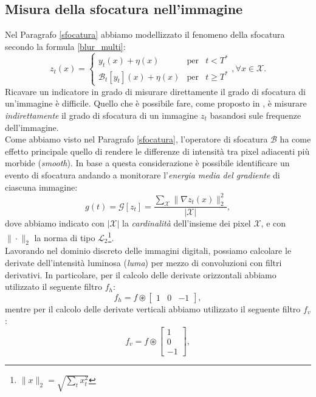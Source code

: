 \subsection{Misura della sfocatura nell'immagine}
Nel Paragrafo \ref{sfocatura} abbiamo modellizzato il fenomeno della sfocatura secondo la formula \eqref{blur_multi}:
\[ 
z_t(x)  = \left\{ \begin{array}{lcl}
y_t(x) + \eta(x) & \mbox{per} & t < T^* \\
\mathcal{B}_t[y_t](x) + \eta(x) & \mbox{per} & t \geq T^*
\end{array}\right. , \forall x \in \mathcal{X}.
\]
Ricavare un indicatore in grado di misurare direttamente il grado di sfocatura di un'immagine \`e difficile.
Quello che \`e possibile fare, come proposto in \cite{alippi2010detecting}, \`e misurare \textit{indirettamente} il grado di sfocatura di un immagine $z_t$ basandosi sule frequenze dell'immagine.\\
Come abbiamo visto nel Paragrafo \ref{sfocatura}, l'operatore di sfocatura $\mathcal{B}$ ha come effetto principale quello di rendere le differenze di intensit\`a tra pixel adiacenti pi\`u morbide (\textit{smooth}).
In base a questa considerazione \`e possibile identificare un evento di sfocatura andando a monitorare l'\textit{energia media del gradiente} di ciascuna immagine:
\begin{equation}
	\label{eq:energyGradient}
	g(t) = \mathcal{G}[z_t] =\frac{\sum_{\mathcal{X}}\| \nabla z_t(x) \| _2^2 }{|\mathcal{X}|} ,
\end{equation}  
dove abbiamo indicato con $|\mathcal{X}|$ la \textit{cardinalit\`a} dell'insieme dei pixel $\mathcal{X}$, e con $\|\cdot\|_2$ la norma di tipo $\mathcal{L}_2$\footnote{$\|x\|_2=\sqrt{\sum_{t}x_t^2}$}.\\
Lavorando nel dominio discreto delle immagini digitali, possiamo calcolare le derivate dell'intensit\`a luminosa (\textit{luma}) per mezzo di convoluzioni con filtri derivativi.
In particolare, per il calcolo delle derivate orizzontali  abbiamo utilizzato il seguente filtro $f_h$:
\[f_h = f \circledast \left[ \begin{array}{rcl}
1 & 0 & -1
\end{array}\right], \] 
mentre per il calcolo delle derivate verticali abbiamo utilizzato il seguente filtro $f_v$:
\[f_v = f \circledast \left[ \begin{array}{r}
1 \\ 0 \\ -1
\end{array}\right], \]

